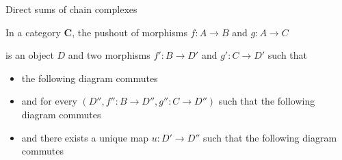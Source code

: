        \item Direct sums of chain complexes


    \item In a category $\mathbf{C}$, the pushout of morphisms $f: A \to B$ and $g : A \to C$ 
    \begin{center}
    \end{center}
    is an object $D$ and two morphisms $f': B \to D'$ and $g' : C \to D'$ such that
    \begin{itemize}
        \item the following diagram commutes
        \begin{center}
        \end{center}
        \item 
        and for every $(D'',f'': B \to D'', g'': C \to D'')$ such that the following diagram commutes
        \begin{center}
        \end{center}
        \item and there exists a unique map $u: D' \to D''$ such that the following diagram commutes
        \begin{center}
        \end{center}    
    \end{itemize} 
    
